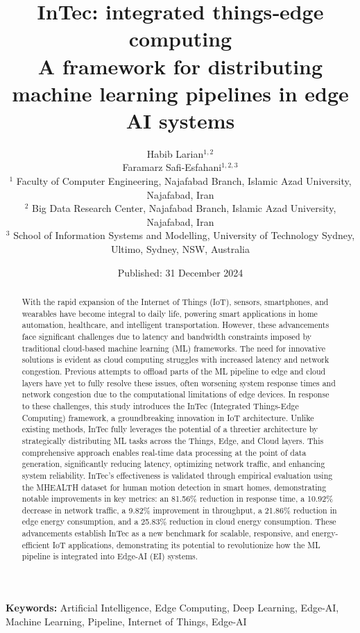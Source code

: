 \documentclass[11pt]{article}
\title{InTec: integrated things‑edge computing\\ A framework
	for distributing machine learning pipelines in edge AI
	systems}
\author{Habib Larian$^{1,2}$ \\
	Faramarz Safi-Esfahani$^{1,2,3}$ \\
	\vspace{0.5em}
	\small $^1$ Faculty of Computer Engineering, Najafabad Branch, Islamic Azad University, Najafabad, Iran \\
	\small $^2$ Big Data Research Center, Najafabad Branch, Islamic Azad University, Najafabad, Iran\\
	\small $^3$ School of Information Systems and Modelling, University of Technology Sydney, Ultimo, Sydney, NSW, Australia}
\date{Published: 31 December 2024}
\begin{document}
	
	\maketitle	
	\begin{abstract}
		With the rapid expansion of the Internet of Things (IoT), sensors, smartphones, and
		wearables have become integral to daily life, powering smart applications in home
		automation, healthcare, and intelligent transportation. However, these advancements face significant challenges due to latency and bandwidth constraints imposed
		by traditional cloud-based machine learning (ML) frameworks. The need for innovative solutions is evident as cloud computing struggles with increased latency
		and network congestion. Previous attempts to offload parts of the ML pipeline to
		edge and cloud layers have yet to fully resolve these issues, often worsening system response times and network congestion due to the computational limitations of
		edge devices. In response to these challenges, this study introduces the InTec (Integrated Things-Edge Computing) framework, a groundbreaking innovation in IoT
		architecture. Unlike existing methods, InTec fully leverages the potential of a threetier architecture by strategically distributing ML tasks across the Things, Edge, and
		Cloud layers. This comprehensive approach enables real-time data processing at the
		point of data generation, significantly reducing latency, optimizing network traffic,
		and enhancing system reliability. InTec’s effectiveness is validated through empirical evaluation using the MHEALTH dataset for human motion detection in smart
		homes, demonstrating notable improvements in key metrics: an 81.56\% reduction
		in response time, a 10.92\% decrease in network traffic, a 9.82\% improvement in
		throughput, a 21.86\% reduction in edge energy consumption, and a 25.83\% reduction in cloud energy consumption. These advancements establish InTec as a new
		benchmark for scalable, responsive, and energy-efficient IoT applications, demonstrating its potential to revolutionize how the ML pipeline is integrated into Edge-AI
		(EI) systems.
	\end{abstract}
	
	\textbf{Keywords:} Artificial Intelligence, Edge Computing, Deep Learning, Edge-AI, Machine Learning, Pipeline, Internet of Things, Edge-AI
	
	
\end{document}
